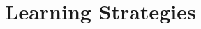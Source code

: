 \documentclass[../Master.tex]{subfiles}
\begin{document}
	\begin{comment}

	    \section*{Sec1}

	    Learning has two important steps to it, the first is figuring out
	    what to do in order to learn about something and the second is analysis
	    of what occured to understand and actually learn about it.


	    Analysing an outcome is about figuring out what occured and what did
	    not occur. For instance if one pressed

	    In a STRIPS domain, all actions are absolute thus we know that if
	    an action changed the state then the action's preconditions was satisfied
	    and all predicates added
    \end{comment}



    \section*{Learning Strategies}\label{sec:strats}
\end{document}
